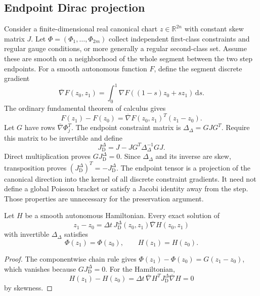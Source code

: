 \subsection{Endpoint Dirac projection}
Consider a finite-dimensional real canonical chart $z\in\mathbb R^{2n}$ with constant skew matrix $J$. Let $\Phi=(\Phi_1,\ldots,\Phi_{2m})$ collect independent first-class constraints and regular gauge conditions, or more generally a regular second-class set. Assume these are smooth on a neighborhood of the whole segment between the two step endpoints. For a smooth autonomous function $F$, define the segment discrete gradient
\begin{equation}
 \overline\nabla F(z_0,z_1)=\int_0^1\nabla F((1-s)z_0+sz_1)\,\mathrm ds.
 \label{c:constraints:discrete-gradient}
\end{equation}
The ordinary fundamental theorem of calculus gives
\begin{equation}
 F(z_1)-F(z_0)=\overline\nabla F(z_0,z_1)^T(z_1-z_0).
 \label{c:constraints:discrete-chain-rule}
\end{equation}
Let $G$ have rows $\overline\nabla\Phi_j^T$. The endpoint constraint matrix is $\Delta_\Delta=GJG^T$. Require this matrix to be invertible and define
\begin{equation}
 J_{\mathrm D}^{\Delta}
       =J-JG^T\Delta_\Delta^{-1}GJ.
 \label{c:constraints:endpoint-tensor}
\end{equation}
Direct multiplication proves $GJ_{\mathrm D}^{\Delta}=0$. Since $\Delta_\Delta$ and its inverse are skew, transposition proves
$(J_{\mathrm D}^{\Delta})^T=-J_{\mathrm D}^{\Delta}$.
The endpoint tensor is a projection of the canonical direction into the kernel of all discrete constraint gradients. It need not define a global Poisson bracket or satisfy a Jacobi identity away from the step. Those properties are unnecessary for the preservation argument.

\begin{theorem}
Let $H$ be a smooth autonomous Hamiltonian. Every exact solution of
\begin{equation}
 z_1-z_0=\Delta t\,J_{\mathrm D}^{\Delta}(z_0,z_1)
                     \overline\nabla H(z_0,z_1)
 \label{c:constraints:implicit-step}
\end{equation}
with invertible $\Delta_\Delta$ satisfies
\begin{equation}
 \Phi(z_1)=\Phi(z_0),\qquad H(z_1)=H(z_0).
\end{equation}
\end{theorem}
\begin{proof}
The componentwise chain rule gives
$\Phi(z_1)-\Phi(z_0)=G(z_1-z_0)$, which vanishes because $GJ_{\mathrm D}^{\Delta}=0$.
For the Hamiltonian,
\begin{equation}
 H(z_1)-H(z_0)
 =\Delta t\,\overline\nabla H^T J_{\mathrm D}^{\Delta}\overline\nabla H=0
\end{equation}
by skewness.
\end{proof}

